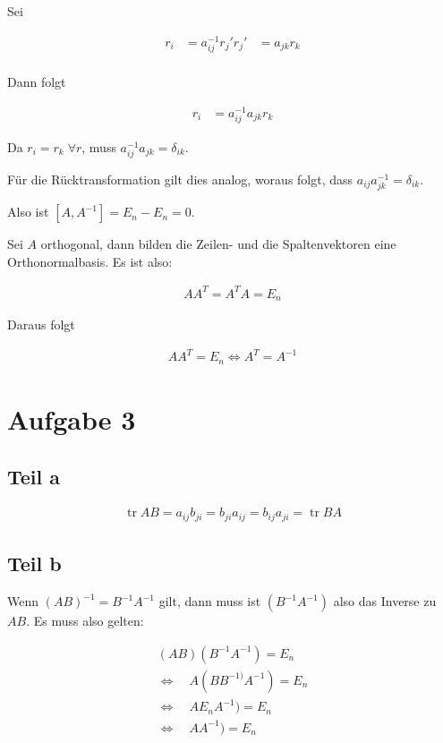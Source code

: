 \documentclass[a4paper,german,12pt,smallheadings]{scrartcl}
\DeclareMathOperator{\tr}{tr}
\begin{document}
Sei

\begin{align*}
  r_i  &= a^{-1}_{ij} r_j'
  r_j' &= a_{jk} r_k \\
\end{align*}

Dann folgt

\begin{align*}
   r_i  &= a^{-1}_{ij} a_{jk} r_k
\end{align*}

Da $r_i = r_k\;\forall r$, muss $a^{-1}_{ij} a_{jk} = \delta_{ik}$.

Für die Rücktransformation gilt dies analog, woraus folgt, dass $a_{ij}
a^{-1}_{jk} = \delta_{ik}$.

Also ist $[A, A^{-1}] = E_n - E_n = 0$.

Sei $A$ orthogonal, dann bilden die Zeilen- und die Spaltenvektoren eine Orthonormalbasis. Es ist also:

\begin{align*}
  AA^T = A^TA = E_n
\end{align*}

Daraus folgt

\begin{align*}
  AA^T = E_n \Leftrightarrow A^T = A^{-1}
\end{align*}

\section*{Aufgabe 3}
\subsection*{Teil a}

\begin{align*}
  \tr AB = a_{ij}b_{ji} = b_{ji}a_{ij} = b_{ij}a_{ji} = \tr BA
\end{align*}

\subsection*{Teil b}
Wenn $(AB)^{-1} = B^{-1}A^{-1}$ gilt, dann muss ist $(B^{-1}A^{-1})$ also das
Inverse zu $AB$. Es muss also gelten:

\begin{align*}
  (AB)(B^{-1}A^{-1}) = E_n \\
  \Leftrightarrow\quad A(BB^{-1)}A^{-1}) = E_n \\
  \Leftrightarrow\quad AE_nA^{-1}) = E_n \\
  \Leftrightarrow\quad AA^{-1}) = E_n \\
\end{align*}
\end{document}

